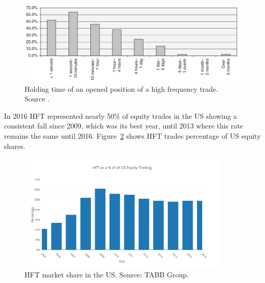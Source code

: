 \begin{figure}[!h]
  \centering
  \includegraphics[width=\textwidth]{img/HFTtradestime}
  \caption[Holding time of an opened position of a high frequency trade]{Holding
  time of an opened position of a high frequency trade. Source
  \cite{aldridge2009}.}
  \label{fig:HFTtimes}
\end{figure}
In 2016 HFT represented nearly 50\% of equity trades in the US showing a
consistent fall since 2009, which was its best year, until 2013 where this rate
remains the same until 2016.  Figure~\ref{fig:HFTmarket1} shows HFT trades
percentage of US equity shares.  

\begin{figure}[!h]
  \centering
  \includegraphics[width=0.9\textwidth]{img/HFTmarket1.png}
  \caption[HFT market share in the US and Europe]{HFT market share in the US.
  Source: TABB Group.}
  \label{fig:HFTmarket1}
\end{figure}

